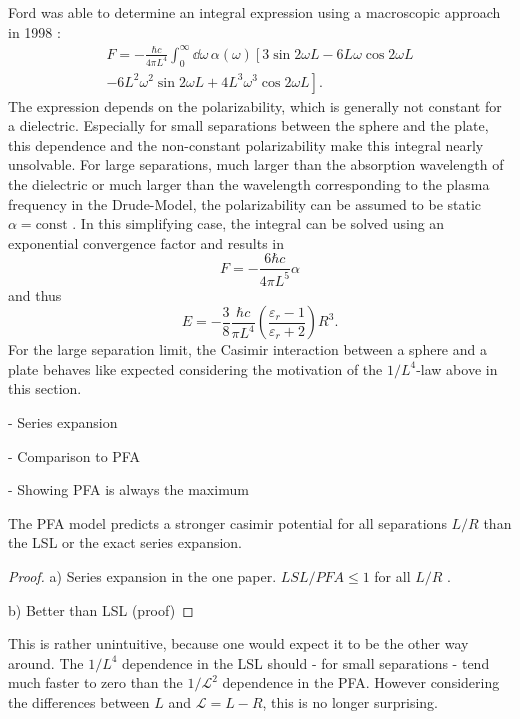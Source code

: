 Ford was able to determine an integral expression using a macroscopic approach in 1998 \cite{Ford_1998}:
\begin{multline}
  F = - \frac{\hbar c}{4 \pi L^4} \int_{0}^{\infty} \dd \omega \, \alpha(\omega) \left[3\sin 2 \omega L - 6L\omega \cos 2 \omega L \right. \\ 
  \left. - 6L^2\omega^2 \sin 2 \omega L + 4L^3\omega^3 \cos 2 \omega L\right].
\end{multline}
The expression depends on the polarizability, which is generally not constant for a dielectric. Especially for small separations between the sphere and the plate, this dependence and the non-constant polarizability make this integral nearly unsolvable.
For large separations, much larger than the absorption wavelength of the dielectric or much larger than the wavelength corresponding to the plasma frequency in the Drude-Model, the polarizability can be assumed to be static $\alpha=\mathrm{const}$ \cite{Ford_1998,Kamp_2020}. In this simplifying case, the integral can be solved using an exponential convergence factor and results in
\begin{equation}
  F = -\frac{6 \hbar c}{4 \pi L^5} \alpha
\end{equation}
and thus 
\begin{equation}
  E = -\frac{3}{8}\frac{\hbar c}{\pi L^4} \left(\frac{\varepsilon_r - 1}{\varepsilon_r + 2}\right)R^3 .
\end{equation}
For the large separation limit, the Casimir interaction between a sphere and a plate behaves like expected considering the motivation of the $1/L^4$-law above in this section.


- Series expansion

- Comparison to PFA

- Showing PFA is always the maximum

\begin{theorem}
  The PFA model predicts a stronger casimir potential for all separations $L/R$ than the LSL or the exact series expansion.
\end{theorem}
\begin{proof}
  a) Series expansion in the one paper. $LSL/PFA \leq 1$ for all $L/R$ \cite{Emig_2007a}.

  b) Better than LSL (proof)
\end{proof}
\begin{remark}
  This is rather unintuitive, because one would expect it to be the other way around. The $1/L^4$ dependence in the LSL should - for small separations - tend much faster to zero than the $1/\mathscr{L}^2$ dependence in the PFA. However considering the differences between $L$ and $\mathscr{L} = L-R$, this is no longer surprising.
\end{remark}